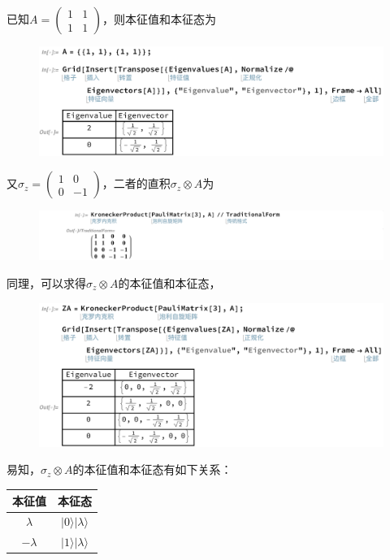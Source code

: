 \documentclass[UTF8,12pt]{article} %
\makeatletter
\newenvironment{proof}[1][\protect\proofname]{\par
\normalfont\topsep6\p@\@plus6\p@\relax
\trivlist
\itemindent\parindent
\item[\hskip\labelsep
\scshape
#1]\ignorespaces
}{%
\endtrivlist\@endpefalse
}
\renewcommand{\proofname}{\it{Solution}}
\makeatother
\begin{document}
\begin{proof}[解]
已知$A = \begin{pmatrix}1&1\\1&1\end{pmatrix}$，则本征值和本征态为
\begin{figure}[H]
\begin{center}
\includegraphics[width=14cm]{A}
\end{center}
\end{figure}
又$\sigma_{z} = \begin{pmatrix}1&0\\0&-1\end{pmatrix}$，二者的直积$\sigma_{z} \otimes A$为
\begin{figure}[H]
\begin{center}
\includegraphics[width=17cm]{otimes}
\end{center}
\end{figure}
同理，可以求得$\sigma_{z} \otimes A$的本征值和本征态，
\begin{figure}[H]
\begin{center}
\includegraphics[width=14cm]{ZA}
\end{center}
\end{figure}
易知，$\sigma_{z} \otimes A$的本征值和本征态有如下关系：
\begin{table}[H]
\begin{center}
\begin{tabular}{|c|c|}\hline
本征值 & 本征态\\\hline
$\lambda$ & $|0\rangle|\lambda\rangle$\\\hline
$-\lambda$ & $|1\rangle|\lambda\rangle$\\\hline
\end{tabular}
\end{center}
\end{table}

\end{proof}
\end{document}
